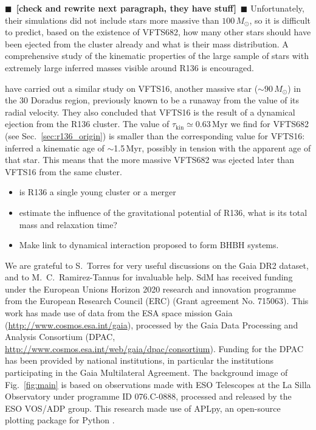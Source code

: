 \documentclass[apjl,twocolumn]{emulateapj}
\newcommand{\todo}[1]{{\large $\blacksquare$~\textbf{\color{red}[#1]}}~$\blacksquare$}
\DeclareRobustCommand{\Figref}[1]{Fig.~\ref{#1}}
\DeclareRobustCommand{\Secref}[1]{Sec.~\ref{#1}}
\begin{document}
\todo{check \cite{banerjee} and rewrite next paragraph, they
  have stuff} Unfortunately, their simulations did not include stars more
massive than $100\,M_\odot$, so it is difficult to predict, based on
the existence of VFTS682, how many other stars should have been
ejected from the cluster already and what is their mass
distribution. A comprehensive study of the kinematic properties of the
large sample of stars with extremely large inferred masses visible
around R136 is encouraged.  

\cite{lennon:18} have carried out a similar study on VFTS16, another
massive star ($\sim90\,M_\odot$) in the 30 Doradus region, previously
known to be a runaway from the value of
its radial velocity. They also concluded that VFTS16 is 
the result of a dynamical ejection from the R136 cluster. 
The value of $\tau_\mathrm{kin}\simeq0.63$\,Myr we find for VFTS682 (see \Secref{sec:r136_origin}) is smaller
than the corresponding value for VFTS16: \cite{lennon:18} inferred a kinematic age of
$\sim$1.5\,Myr, possibly in tension with the apparent age of that star. This means that the more
massive VFTS682 was ejected later than VFTS16 from the same cluster.



\begin{itemize}
\item is R136 a single young cluster or a merger
\item estimate the influence of the gravitational potential of R136,
  what is its total mass and relaxation time?
\item Make link to dynamical interaction proposed to form BHBH systems.
\end{itemize}







\begin{acknowledgements}
  \small
  We are grateful to S.~Torres for 
  very useful discussions on the
  Gaia DR2 dataset, and to M.~C.~Ramirez-Tannus for invaluable help.
  SdM has received funding under the European Unions Horizon 2020 research and innovation programme from the European Research
  Council (ERC) (Grant agreement No. 715063).
  This work has made use of data from the ESA space mission Gaia (\url{http://www.cosmos.esa.int/gaia}), processed by the Gaia Data Processing and Analysis Consortium (DPAC, \url{http://www.cosmos.esa.int/web/gaia/dpac/consortium}). Funding for the DPAC has been provided by national institutions, in particular the institutions participating in the Gaia Multilateral Agreement. 
  The background image of \Figref{fig:main} is based on observations
  made with ESO Telescopes at the La Silla Observatory under programme
  ID 076.C-0888, processed and released by the ESO VOS/ADP group.
  This research made use of APLpy, an open-source plotting package for Python \citep[][]{robitaille:12}.
\end{acknowledgements}
\end{document}
